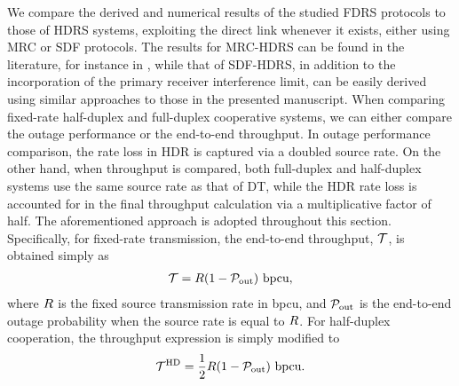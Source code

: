 \documentclass[10pt,journal]{IEEEtran}
\begin{document}
We compare the derived and numerical results of the studied \ac{FDRS} protocols to those of \ac{HDRS} systems, exploiting the direct link whenever it exists, either using \ac{MRC} or \ac{SDF} protocols. The results for \ac{MRC}-\ac{HDRS} can be found in the literature, for instance in \cite{200912_SPL_RS_SC_Nakagami,201005_SPL_RS_Nakagami}, while that of \ac{SDF}-\ac{HDRS}, in addition to the incorporation of the primary receiver interference limit, can be easily derived using similar approaches to those in the presented manuscript. When comparing fixed-rate half-duplex and full-duplex cooperative systems, we can either compare the outage performance or the end-to-end throughput. In outage performance comparison, the rate loss in \ac{HDR} is captured via a doubled source rate. On the other hand, when throughput is compared, both full-duplex and half-duplex systems use the same source rate as that of \ac{DT}, while the \ac{HDR} rate loss is accounted for in the final throughput calculation via a multiplicative factor of half. The aforementioned approach is adopted throughout this section. Specifically, for fixed-rate transmission, the end-to-end throughput, $\mathcal{T}$, is obtained simply as
\begin{eqnarray}
\mathcal{T} = R (1-{\mathcal{P}_{\rm out}}) \text{ bpcu},
\end{eqnarray}
where $R$ is the fixed source transmission rate in \ac{bpcu}, and ${\mathcal{P}_{\rm out}}$ is the end-to-end outage probability when the source rate is equal to $R$. For half-duplex cooperation, the throughput expression is simply modified to
\begin{eqnarray}
\mathcal{T}^{\rm HD} = \frac{1}{2} R (1-{\mathcal{P}_{\rm out}}) \text{ bpcu}.
\end{eqnarray}
\end{document}
